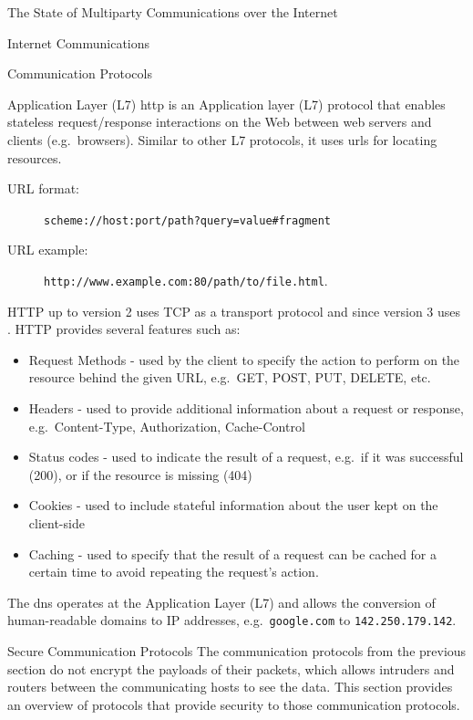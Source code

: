 \begin{frame}[fragile]{The State of Multiparty Communications over the
Internet}
\begin{block}{Internet Communications}
\begin{block}{Communication Protocols}
\begin{block}{Application Layer (L7)}
\protect\hypertarget{application-layer-l7}{}
\gls{http} is an Application layer (L7) protocol that enables stateless
request/response interactions on the Web between web servers and clients
(e.g.~browsers). Similar to other L7 protocols, it uses \glspl{url} for
locating resources.

\begin{description}
\item[URL format:]
\texttt{scheme://host:port/path?query=value\#fragment}
\item[URL example:]
\texttt{http://www.example.com:80/path/to/file.html}.
\end{description}

HTTP up to version 2 uses TCP as a transport protocol and since version
3 uses . HTTP provides several features such as:

\begin{itemize}
\tightlist
\item
  Request Methods - used by the client to specify the action to perform
  on the resource behind the given URL, e.g.~GET, POST, PUT, DELETE,
  etc.
\item
  Headers - used to provide additional information about a request or
  response, e.g.~Content-Type, Authorization, Cache-Control
\item
  Status codes - used to indicate the result of a request, e.g.~if it
  was successful (200), or if the resource is missing (404)
\item
  Cookies - used to include stateful information about the user kept on
  the client-side
\item
  Caching - used to specify that the result of a request can be cached
  for a certain time to avoid repeating the request's action.
\end{itemize}

The \gls{dns} operates at the Application Layer (L7) and allows the
conversion of human-readable domains to IP addresses,
e.g.~\texttt{google.com} to \texttt{142.250.179.142}.
\end{block}
\end{block}

\begin{block}{Secure Communication Protocols}
\protect\hypertarget{secure-communication-protocols}{}
The communication protocols from the previous section do not encrypt the
payloads of their packets, which allows intruders and routers between
the communicating hosts to see the data. This section provides an
overview of protocols that provide security to those communication
protocols.


\end{block}
\end{block}
\end{frame}
